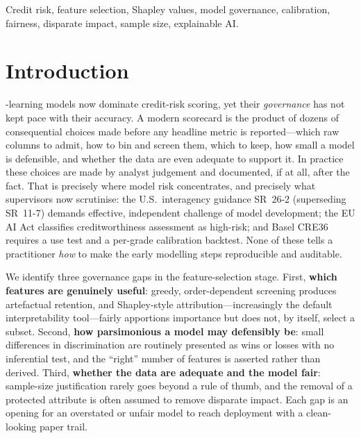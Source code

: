 \documentclass[9pt,journal]{IEEEtai}
\begin{document}
\begin{IEEEkeywords}
Credit risk, feature selection, Shapley values, model governance, calibration, fairness,
disparate impact, sample size, explainable AI.
\end{IEEEkeywords}

\section{Introduction}
-learning models now dominate credit-risk scoring, yet their
\emph{governance} has not kept pace with their accuracy. A modern scorecard is the product of
dozens of consequential choices made before any headline metric is reported---which raw columns
to admit, how to bin and screen them, which to keep, how small a model is defensible, and whether
the data are even adequate to support it. In practice these choices are made by analyst
judgement and documented, if at all, after the fact. That is precisely where model risk
concentrates, and precisely what supervisors now scrutinise: the U.S.\ interagency guidance
SR~26-2 (superseding SR~11-7) demands effective, independent challenge of model development; the
EU AI Act classifies creditworthiness assessment as high-risk; and Basel CRE36 requires a use
test and a per-grade calibration backtest. None of these tells a practitioner \emph{how} to make
the early modelling steps reproducible and auditable.

We identify three governance gaps in the feature-selection stage. First, \textbf{which features
are genuinely useful}: greedy, order-dependent screening produces artefactual retention, and
Shapley-style attribution---increasingly the default interpretability tool---fairly apportions
importance but does not, by itself, select a subset. Second, \textbf{how parsimonious a model may
defensibly be}: small differences in discrimination are routinely presented as wins or losses
with no inferential test, and the ``right'' number of features is asserted rather than derived.
Third, \textbf{whether the data are adequate and the model fair}: sample-size justification
rarely goes beyond a rule of thumb, and the removal of a protected attribute is often assumed to
remove disparate impact. Each gap is an opening for an overstated or unfair model to reach
deployment with a clean-looking paper trail.
\end{document}
